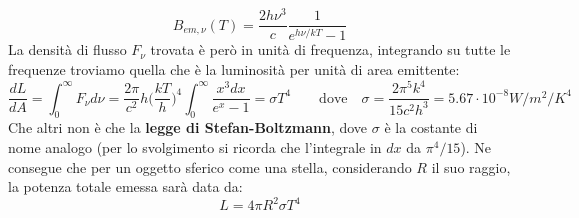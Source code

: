\documentclass[a4paper,twoside,openany,notitlepage]{book}
\newcommand{\e}[1]{\cdot 10^{#1}}
\theoremstyle{definition}
\theoremstyle{plain}
\begin{document}
\begin{equation*}
	B_{em,\nu} (T) = \frac{2h\nu^3}{c}\frac{1}{e^{h\nu/kT}-1}
\end{equation*}
La densità di flusso $F_\nu$ trovata è però in unità di frequenza, integrando su tutte le frequenze troviamo quella che è la luminosità per unità di area emittente:
\begin{equation*}
	\frac{dL}{dA} = \int_{0}^{\infty} F_\nu d\nu =
	\frac{2\pi}{c^2}h \biggl( \frac{kT}{h} \biggr)^4 \int_{0}^{\infty} \frac{x^3 dx}{e^x-1} =
	\sigma T^4 \qquad \text{dove} \quad
	\sigma = \frac{2\pi^5k^4}{15c^2h^3} = 5.67\e{-8}W/m^2/K^4
\end{equation*}
Che altri non è che la \textbf{legge di Stefan-Boltzmann}, dove $\sigma$ è la costante di nome analogo (per lo svolgimento si ricorda che l'integrale in $dx$ da $\pi^4/15$). Ne consegue che per un oggetto sferico come una stella, considerando $R$ il suo raggio, la potenza totale emessa sarà data da:
\begin{equation}
	\label{eq:Stef-Boltz}
	L = 4\pi R^2 \sigma T^4
\end{equation}
\end{document}
